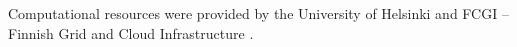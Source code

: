 \documentclass[english,twoside,openright]{HYgradu}
\begin{document}














Computational resources were provided by the University of Helsinki and FCGI -- Finnish Grid and Cloud Infrastructure \cite{finnishGridAndCloud}.


\cleardoublepage %


\renewcommand{\bibname}{References}


\end{document}
